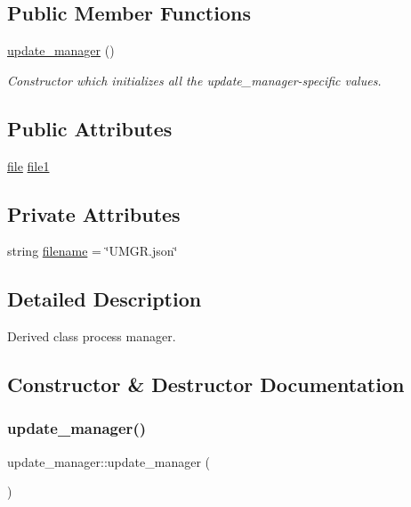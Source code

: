 \subsection*{Public Member Functions}
\begin{DoxyCompactItemize}
\item 
\hyperlink{classupdate__manager_a8e4ba9f4d46f5100825dd8853bdd06f4}{update\+\_\+manager} ()
\begin{DoxyCompactList}\small\item\em Constructor which initializes all the update\+\_\+manager-\/specific values. \end{DoxyCompactList}\end{DoxyCompactItemize}
\subsection*{Public Attributes}
\begin{DoxyCompactItemize}
\item 
\hyperlink{classfile}{file} \hyperlink{classupdate__manager_a4c743063be347d20da665ace8fc1a4a2}{file1}
\end{DoxyCompactItemize}
\subsection*{Private Attributes}
\begin{DoxyCompactItemize}
\item 
string \hyperlink{classupdate__manager_a33846f6785525471da67ebfcbf36b5e6}{filename} = \char`\"{}U\+M\+G\+R.\+json\char`\"{}
\end{DoxyCompactItemize}


\subsection{Detailed Description}
Derived class process manager. 

\subsection{Constructor \& Destructor Documentation}
\mbox{\label{classupdate__manager_a8e4ba9f4d46f5100825dd8853bdd06f4}} 
\subsubsection{\texorpdfstring{update\+\_\+manager()}{update\_manager()}}
{\footnotesize\ttfamily update\+\_\+manager\+::update\+\_\+manager (\begin{DoxyParamCaption}{ }\end{DoxyParamCaption})}



